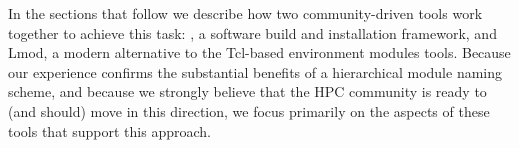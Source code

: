 In the sections that follow we describe how two community-driven tools work
together to achieve this task: \easybuild{}, a software build and installation
framework, and Lmod, a modern alternative to the Tcl-based environment modules
tools. Because our experience confirms the substantial benefits of a hierarchical
module naming scheme, and because we strongly believe that the HPC community is
ready to (and should) move in this direction, we focus primarily on the aspects
of these tools that support this approach.
